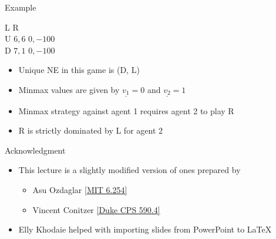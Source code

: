 \documentclass[11pt,aspectratio=169,handout]{beamer}
\begin{document}
  
  \begin{frame}{Example}
   \begin{center}
    \hspace{-0.2em}
    \begin{game}{2}{2}
     	\> L			\> R				\\
     U	\> $6, 6$	\> $ 0, -100$	\\
     D	\> $7, 1$	\> $ 0, -100$
    \end{game}
   \end{center}
   \vspace{1em}
   \begin{itemize}
    \item Unique NE in this game is (D, L)
    \item Minmax values are given by $\underline{v_{1}} = 0 $ and $\underline{v_{2}} = 1 $ 
    \item Minmax strategy against agent 1 requires agent 2 to play R
    \item R is strictly dominated by L for agent 2
   \end{itemize}
  \end{frame}
  
  
  \begin{frame}{Acknowledgment}
   \begin{itemize}
   \setlength{\itemsep}{1em}
    \item This lecture is a slightly modified version of ones prepared by
    \begin{itemize}
     \item Asu Ozdaglar \href{https://ocw.mit.edu/courses/electrical-engineering-and-computer-science/6-254-game-theory-with-engineering-applications-spring-2010/index.htm}{[MIT 6.254]}
     \item Vincent Conitzer \href{https://courses.cs.duke.edu/spring16/compsci590.4/}{[Duke CPS 590.4]}
    \end{itemize}
    \item Elly Khodaie helped with importing slides from PowerPoint to \LaTeX
   \end{itemize}
  \end{frame}
\end{document}
